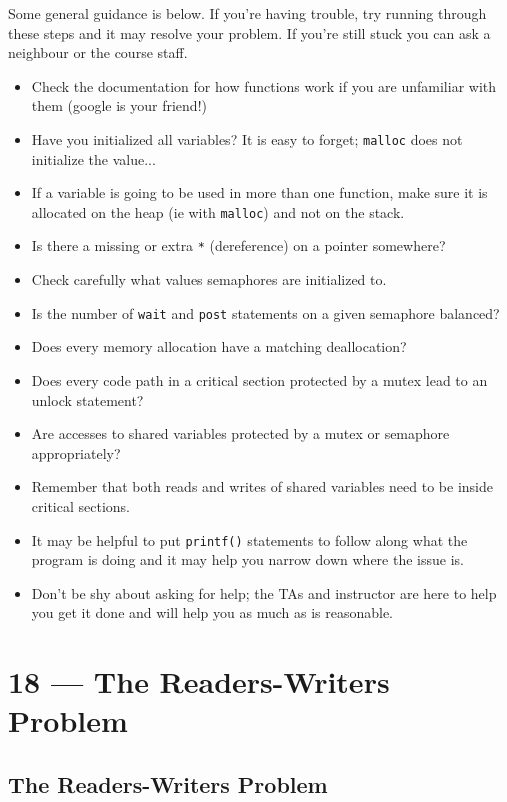 \documentclass[a4paper]{report}
\begin{document}
Some general guidance is below. If you're having trouble, try running through these steps and it may resolve your problem. If you're still stuck you can ask a neighbour or the course staff.
\begin{itemize}
	\item Check the documentation for how functions work if you are unfamiliar with them (google is your friend!)
	\item Have you initialized all variables? It is easy to forget; \texttt{malloc} does not initialize the value...
	\item If a variable is going to be used in more than one function, make sure it is allocated on the heap (ie with \texttt{malloc}) and not on the stack.
	\item Is there a missing or extra \texttt{*} (dereference) on a pointer somewhere?
	\item Check carefully what values semaphores are initialized to.
	\item Is the number of \texttt{wait} and \texttt{post} statements on a given semaphore balanced?
	\item Does every memory allocation have a matching deallocation?
	\item Does every code path in a critical section protected by a mutex lead to an unlock statement?
	\item Are accesses to shared variables protected by a mutex or semaphore appropriately?
	\item Remember that both reads and writes of shared variables need to be inside critical sections.
	\item It may be helpful to put \texttt{printf()} statements to follow along what the program is doing and it may help you narrow down where the issue is.
	\item Don't be shy about asking for help; the TAs and instructor are here to help you get it done and will help you as much as is reasonable.
\end{itemize}








\chapter*{18 --- The Readers-Writers Problem}


\section*{The Readers-Writers Problem}
\end{document}

